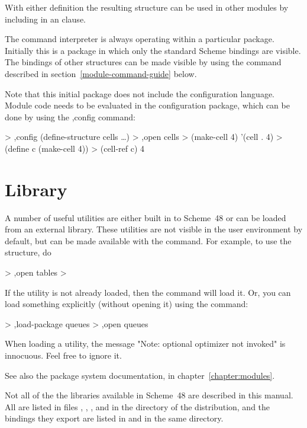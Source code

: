 With either definition the resulting structure can be used in other
 modules by including  in an  clause.

The command interpreter is always operating within a particular package.
Initially this is a package in which only the standard Scheme bindings
 are visible.
The bindings of other structures can be made visible by using the 
 command described in section~\ref{module-command-guide} below.

Note that this initial package does not include the configuration language.
Module code needs to be evaluated in the configuration package, which can
 be done by using the {\code ,config} command:
\begin{example}
> ,config (define-structure cells \ldots)
> ,open cells
> (make-cell 4)
'(cell . 4)
> (define c (make-cell 4))
> (cell-ref c)
4
\end{example}

\section{Library}

A number of useful utilities are either built in to Scheme~48 or can
be loaded from an external library.  These utilities are not visible
in the user environment by default, but can be made available with the
 command.  For example, to use the  structure, do
\begin{example}
> ,open tables
> 
\end{example}

If the utility is not already loaded, then the  command will
 load it.
Or, you can load something explicitly (without opening it) using the
 command:
\begin{example}
> ,load-package queues
> ,open queues
\end{example}

When loading a utility, the message "Note: optional optimizer not
invoked" is innocuous.  Feel free to ignore it.

See also the package system documentation, in
chapter~\ref{chapter:modules}.

Not all of the the libraries available in Scheme~48 are described in this
 manual.
All are listed in files ,
 , , and
  in the  directory of the distribution,
 and the bindings they
 export are listed in  and
  in the same directory.


